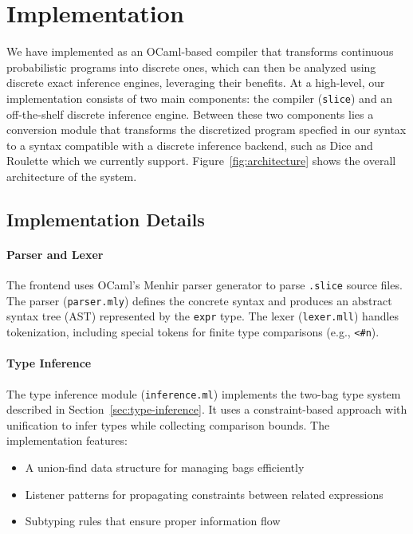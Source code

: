 \section{Implementation}\label{sec:implementation}

We have implemented \Slice{} as an OCaml-based compiler that transforms continuous probabilistic programs into discrete ones, which can then be analyzed using discrete exact inference engines, leveraging their benefits. At a high-level, our implementation consists of two main components: the \Slice{} compiler (\texttt{slice}) and an off-the-shelf discrete inference engine. Between these two components lies a conversion module that transforms the discretized program specfied in our syntax to a syntax compatible with a discrete inference backend, such as Dice and Roulette which we currently support. Figure~\ref{fig:architecture} shows the overall architecture of the \Slice{} system.



\subsection{Implementation Details}

\paragraph{Parser and Lexer} The frontend uses OCaml's Menhir parser generator to parse \texttt{.slice} source files. The parser (\texttt{parser.mly}) defines the concrete syntax and produces an abstract syntax tree (AST) represented by the \texttt{expr} type. The lexer (\texttt{lexer.mll}) handles tokenization, including special tokens for finite type comparisons (e.g., \texttt{<\#n}).

\paragraph{Type Inference} The type inference module (\texttt{inference.ml}) implements the two-bag type system described in Section~\ref{sec:type-inference}. It uses a constraint-based approach with unification to infer types while collecting comparison bounds. The implementation features:
\begin{itemize}
    \item A union-find data structure for managing bags efficiently
    \item Listener patterns for propagating constraints between related expressions
    \item Subtyping rules that ensure proper information flow
\end{itemize}

